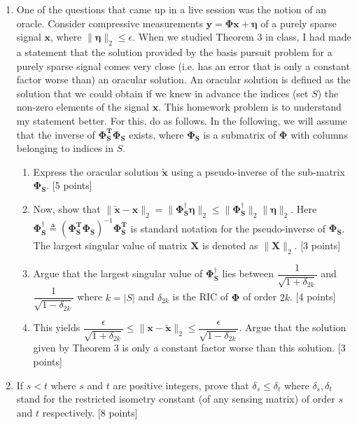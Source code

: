 \documentclass[11pt]{article}
\begin{document}
\begin{enumerate}
\item One of the questions that came up in a live session was the notion of an oracle. Consider compressive measurements $\boldsymbol{y} = \boldsymbol{\Phi x} + \boldsymbol{\eta}$ of a purely sparse signal $\boldsymbol{x}$, where $\|\boldsymbol{\eta}\|_2 \leq \epsilon$. When we studied Theorem 3 in class, I had made a statement that the solution provided by the basis pursuit problem for a purely sparse signal comes very close (i.e. has an error that is only a constant factor worse than) an oracular solution. An oracular solution is defined as the solution that we could obtain if we knew in advance the indices (set $S$) the non-zero elements of the signal $\boldsymbol{x}$. This homework problem is to understand my statement better. For this, do as follows. In the following, we will assume that the inverse of $\boldsymbol{\Phi^T_S \Phi_S}$ exists, where $\boldsymbol{\Phi_S}$ is a submatrix of $\boldsymbol{\Phi}$ with columns belonging to indices in $S$.
\begin{enumerate}
\item Express the oracular solution $\boldsymbol{\tilde{x}}$ using a pseudo-inverse of the sub-matrix $\boldsymbol{\Phi_S}$. \textsf{[5 points]}
\item Now, show that $\|\boldsymbol{\tilde{x}}-\boldsymbol{x}\|_2 = \|\boldsymbol{\Phi^{\dagger}_S \eta}\|_2 \leq \|\boldsymbol{\Phi^{\dagger}_S}\|_2 \|\boldsymbol{\eta}\|_2$. 
Here $\boldsymbol{\Phi^{\dagger}_S} \triangleq (\boldsymbol{\Phi^T_S \Phi_S})^{-1} \boldsymbol{\Phi^T_S }$ is standard notation for the pseudo-inverse of $\boldsymbol{\Phi_S}$. The largest singular value of matrix $\boldsymbol{X}$ is denoted as $\|\boldsymbol{X}\|_2$.  \textsf{[3 points]}
\item Argue that the largest singular value of $\boldsymbol{\Phi^{\dagger}_S}$ lies between $\dfrac{1}{\sqrt{1+ \delta_{2k}}}$ and $\dfrac{1}{\sqrt{1- \delta_{2k}}}$ where $k = |S|$ and $\delta_{2k}$ is the RIC of $\boldsymbol{\Phi}$ of order $2k$.  \textsf{[4 points]}
\item This yields $\dfrac{\epsilon}{\sqrt{1+\delta_{2k}}} \leq \|\boldsymbol{x}-\boldsymbol{\tilde{x}}\|_2 \leq \dfrac{\epsilon}{\sqrt{1-\delta_{2k}}}$. Argue that the solution given by Theorem 3 is only a constant factor worse than this solution.  \textsf{[3 points]}
\end{enumerate}

\item If $s < t$ where $s$ and $t$ are positive integers, prove that $\delta_s \leq \delta_t$ where $\delta_s, \delta_t$ stand for the restricted isometry constant (of any sensing matrix) of order $s$ and $t$ respectively. \textsf{[8 points]}


\end{enumerate}
\end{document}
